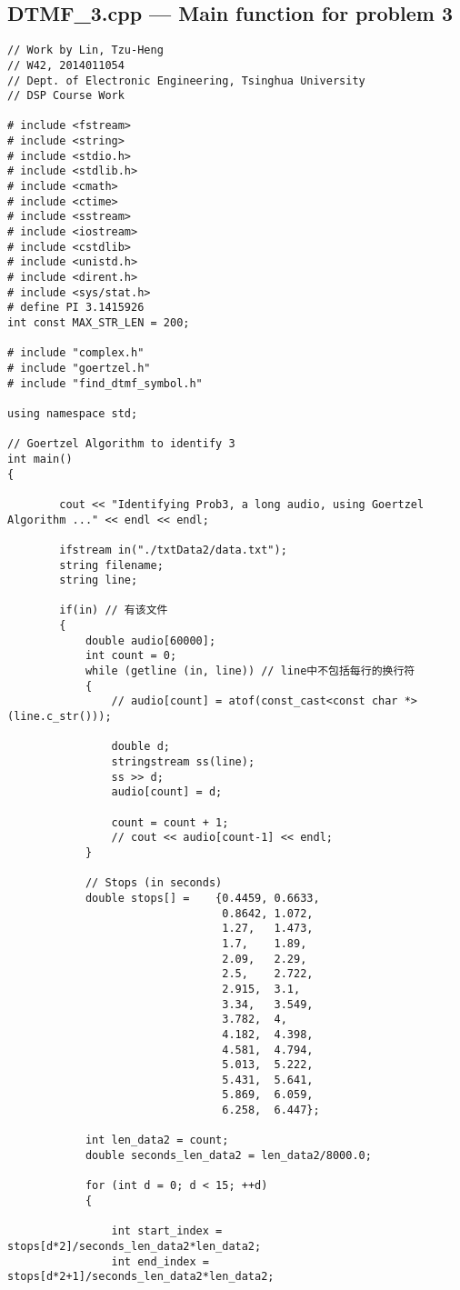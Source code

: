 \subsection{DTMF\_3.cpp --- Main function for problem 3}\label{dtmf3}
\begin{lstlisting}
// Work by Lin, Tzu-Heng
// W42, 2014011054
// Dept. of Electronic Engineering, Tsinghua University
// DSP Course Work

# include <fstream>
# include <string>
# include <stdio.h>
# include <stdlib.h>
# include <cmath>
# include <ctime>
# include <sstream>
# include <iostream>
# include <cstdlib>
# include <unistd.h>  
# include <dirent.h>  
# include <sys/stat.h>  
# define PI 3.1415926
int const MAX_STR_LEN = 200;  

# include "complex.h"
# include "goertzel.h"
# include "find_dtmf_symbol.h"

using namespace std;

// Goertzel Algorithm to identify 3
int main()
{

		cout << "Identifying Prob3, a long audio, using Goertzel Algorithm ..." << endl << endl;

		ifstream in("./txtData2/data.txt");
		string filename;
		string line;
		
		if(in) // 有该文件  
		{
			double audio[60000];
			int count = 0;
			while (getline (in, line)) // line中不包括每行的换行符
			{
				// audio[count] = atof(const_cast<const char *>(line.c_str()));

				double d;
				stringstream ss(line);
				ss >> d;
				audio[count] = d;

				count = count + 1;
				// cout << audio[count-1] << endl;
			}

			// Stops (in seconds)
			double stops[] = 	{0.4459, 0.6633,
							     0.8642, 1.072,
							     1.27,   1.473,
							     1.7,    1.89,
							     2.09,   2.29,
							     2.5,    2.722,
							     2.915,  3.1,
							     3.34,   3.549,
							     3.782,  4,
							     4.182,  4.398, 
							     4.581,  4.794,
							     5.013,  5.222, 
							     5.431,  5.641, 
							     5.869,  6.059, 
							     6.258,  6.447};

		    int len_data2 = count;
			double seconds_len_data2 = len_data2/8000.0;

			for (int d = 0; d < 15; ++d)
			{

				int start_index = stops[d*2]/seconds_len_data2*len_data2;
				int end_index = stops[d*2+1]/seconds_len_data2*len_data2;


\end{lstlisting}

